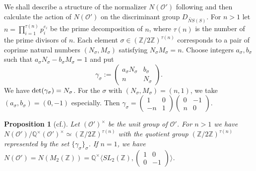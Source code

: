 \documentclass{article}
\theoremstyle{plain}
\newtheorem{proposition}[theorem]{Proposition}%
\theoremstyle{definition}
\theoremstyle{remark}
\newcommand{\Z}{{\mathbb Z}}
\newcommand{\Q}{{\mathbb Q}}
\begin{document}
We shall describe a structure of the normalizer $N(\mathcal{O}')$ following \cite{Vi} 
and then calculate the action of $N(\mathcal{O}')$ on the discriminant group $D_{\widetilde{NS}(S)}$.   
For $n>1$  
let  
$n=\prod_{i=1}^{\tau (n)}p_{i}^{e_{i}}$ 
be the prime decomposition of $n$, 
where 
$\tau (n)$ is the number of the prime divisors of $n$.  
Each element 
$\sigma \in ({\Z}/2{\Z})^{\tau (n)}$ 
corresponds to 
a pair of coprime natural numbers 
$(N_{\sigma}, M_{\sigma})$ 
satisfying $N_{\sigma}M_{\sigma}=n$.  
Choose integers 
$a_{\sigma}, b_{\sigma}$ 
such that 
$a_{\sigma}N_{\sigma}-b_{\sigma}M_{\sigma} =1$ 
and put 
\begin{equation*}\label{Atkin-Lehner involutions}
\gamma _{\sigma} 
:= 
\begin{pmatrix}
a_{\sigma}N_{\sigma} & b_{\sigma} \\ 
n                                            & N_{\sigma}
\end{pmatrix} .
\end{equation*}
We have 
${\rm det\/}( \gamma _{\sigma} ) = N_{\sigma}$.  
For the $\sigma $ with 
$(N_{\sigma}, M_{\sigma}) = (n, 1)$, 
we take 
$(a_{\sigma}, b_{\sigma}) = (0, -1)$ 
especially. 
Then 
$
\gamma _{\sigma} = 
(
\begin{smallmatrix}
1  & 0 \\
-n & 1 
\end{smallmatrix}
)
(
\begin{smallmatrix}
0  & -1 \\
n  & 0 
\end{smallmatrix}
)
$. 













\begin{proposition}[cf.\cite{Vi}]\label{description of the normalizer}
Let $(\mathcal{O}')^{\times}$ be the unit group of $\mathcal{O}'$.
For $n>1$   
we have 
$ N(\mathcal{O}')/{\Q}^{\times}(\mathcal{O}')^{\times} \simeq ({\Z}/2{\Z})^{\tau (n)}$ 
with the quotient group 
$({\Z}/2{\Z})^{\tau (n)}$ 
represented by the set 
$\{ \gamma _{\sigma} \} _{\sigma}$. 
If $n=1$, 
we have 
$
N(\mathcal{O}') = N(M_{2}({\Z})) = 
{\Q}^{\times}\langle SL_{2}({\Z}), 
         (
           \begin{smallmatrix} 
              1 & 0 \\
              0 & -1 
            \end{smallmatrix}
          ) 
          \rangle 
$. 
\end{proposition} 
\end{document}
